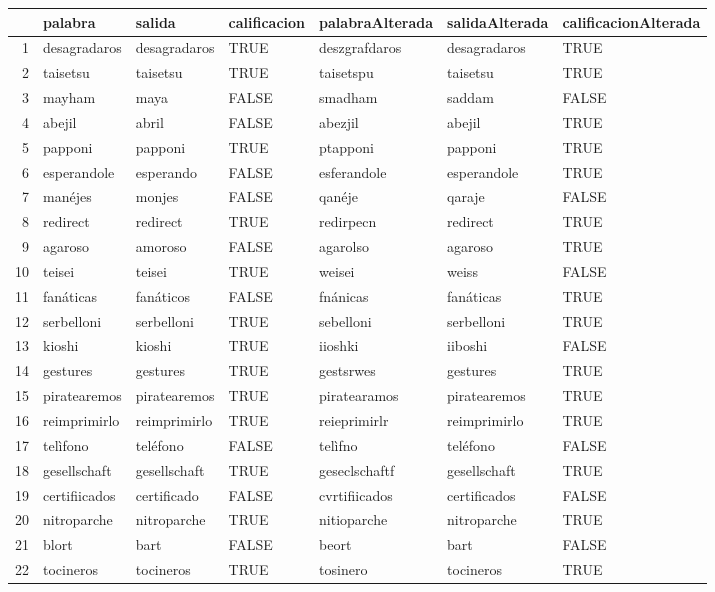 \documentclass[paper=letter, fontsize=11pt]{scrartcl}
\numberwithin{equation}{section} %
\numberwithin{figure}{section} %
\numberwithin{table}{section} %
\begin{document}
\begin{table}[ht]
\centering
\begin{tabular}{rllllll}
  \hline
 & palabra & salida & calificacion & palabraAlterada & salidaAlterada & calificacionAlterada \\ 
  \hline
1 & desagradaros & desagradaros & TRUE & deszgrafdaros & desagradaros & TRUE \\ 
  2 & taisetsu & taisetsu & TRUE & taisetspu & taisetsu & TRUE \\ 
  3 & mayham & maya & FALSE & smadham & saddam & FALSE \\ 
  4 & abejil & abril & FALSE & abezjil & abejil & TRUE \\ 
  5 & papponi & papponi & TRUE & ptapponi & papponi & TRUE \\ 
  6 & esperandole & esperando & FALSE & esferandole & esperandole & TRUE \\ 
  7 & manéjes & monjes & FALSE & qanéje & qaraje & FALSE \\ 
  8 & redirect & redirect & TRUE & redirpecn & redirect & TRUE \\ 
  9 & agaroso & amoroso & FALSE & agarolso & agaroso & TRUE \\ 
  10 & teisei & teisei & TRUE & weisei & weiss & FALSE \\ 
  11 & fanáticas & fanáticos & FALSE & fnánicas & fanáticas & TRUE \\ 
  12 & serbelloni & serbelloni & TRUE & sebelloni & serbelloni & TRUE \\ 
  13 & kioshi & kioshi & TRUE & iioshki & iiboshi & FALSE \\ 
  14 & gestures & gestures & TRUE & gestsrwes & gestures & TRUE \\ 
  15 & piratearemos & piratearemos & TRUE & piratearamos & piratearemos & TRUE \\ 
  16 & reimprimirlo & reimprimirlo & TRUE & reieprimirlr & reimprimirlo & TRUE \\ 
  17 & telìfono & teléfono & FALSE & telìfno & teléfono & FALSE \\ 
  18 & gesellschaft & gesellschaft & TRUE & geseclschaftf & gesellschaft & TRUE \\ 
  19 & certifiicados & certificado & FALSE & cvrtifiicados & certificados & FALSE \\ 
  20 & nitroparche & nitroparche & TRUE & nitioparche & nitroparche & TRUE \\ 
  21 & blort & bart & FALSE & beort & bart & FALSE \\ 
  22 & tocineros & tocineros & TRUE & tosinero & tocineros & TRUE \\ 

\end{tabular}
\end{table}
\end{document}
